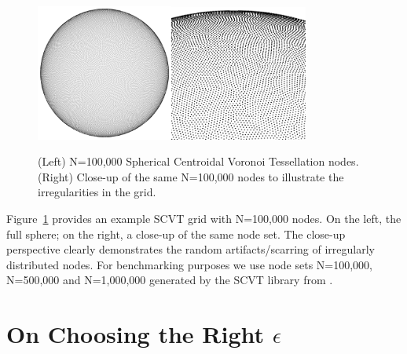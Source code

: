 \documentclass[11pt]{report}
\begin{document}
{\begin{figure} 
\centering
\includegraphics[width=0.4\textwidth]{rbffd_methods_content/grids/N100000_points.png}\includegraphics[width=0.405\textwidth]{rbffd_methods_content/grids/N100000_closeup2.png} 
\caption{(Left) N=100,000 Spherical Centroidal Voronoi Tessellation nodes. (Right) Close-up of the same N=100,000 nodes to illustrate the irregularities in the grid.} 
\label{fig:scvt_nodes}
\end{figure}

Figure~\ref{fig:scvt_nodes} provides an example SCVT grid with N=100,000 nodes. On the left, the full sphere; on the right, a close-up of the same node set. The close-up perspective clearly demonstrates the random artifacts/scarring of irregularly distributed nodes. For benchmarking purposes we use node sets N=100,000, N=500,000 and N=1,000,000 generated by the SCVT library from \cite{Womeldorff2008}. 

%
%
%

\section{On Choosing the Right $\epsilon$} 

}
\end{document}
